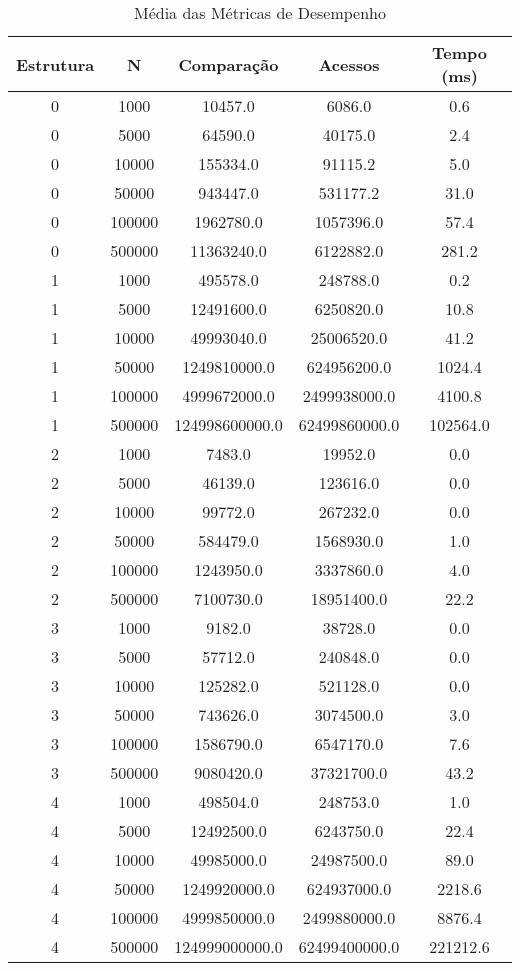 \begin{table}[htbp]
\caption{Média das Métricas de Desempenho}
\label{tab:table1}
\begin{tabular}{c|c|c|c|c}
\textbf{Estrutura} & \textbf{N} & \textbf{Comparação} & \textbf{Acessos} & \textbf{Tempo (ms)}\\
\hline
0 & 1000 & 10457.0 & 6086.0 & 0.6\\
0 & 5000 & 64590.0 & 40175.0 & 2.4\\
0 & 10000 & 155334.0 & 91115.2 & 5.0\\
0 & 50000 & 943447.0 & 531177.2 & 31.0\\
0 & 100000 & 1962780.0 & 1057396.0 & 57.4\\
0 & 500000 & 11363240.0 & 6122882.0 & 281.2\\
1 & 1000 & 495578.0 & 248788.0 & 0.2\\
1 & 5000 & 12491600.0 & 6250820.0 & 10.8\\
1 & 10000 & 49993040.0 & 25006520.0 & 41.2\\
1 & 50000 & 1249810000.0 & 624956200.0 & 1024.4\\
1 & 100000 & 4999672000.0 & 2499938000.0 & 4100.8\\
1 & 500000 & 124998600000.0 & 62499860000.0 & 102564.0\\
2 & 1000 & 7483.0 & 19952.0 & 0.0\\
2 & 5000 & 46139.0 & 123616.0 & 0.0\\
2 & 10000 & 99772.0 & 267232.0 & 0.0\\
2 & 50000 & 584479.0 & 1568930.0 & 1.0\\
2 & 100000 & 1243950.0 & 3337860.0 & 4.0\\
2 & 500000 & 7100730.0 & 18951400.0 & 22.2\\
3 & 1000 & 9182.0 & 38728.0 & 0.0\\
3 & 5000 & 57712.0 & 240848.0 & 0.0\\
3 & 10000 & 125282.0 & 521128.0 & 0.0\\
3 & 50000 & 743626.0 & 3074500.0 & 3.0\\
3 & 100000 & 1586790.0 & 6547170.0 & 7.6\\
3 & 500000 & 9080420.0 & 37321700.0 & 43.2\\
4 & 1000 & 498504.0 & 248753.0 & 1.0\\
4 & 5000 & 12492500.0 & 6243750.0 & 22.4\\
4 & 10000 & 49985000.0 & 24987500.0 & 89.0\\
4 & 50000 & 1249920000.0 & 624937000.0 & 2218.6\\
4 & 100000 & 4999850000.0 & 2499880000.0 & 8876.4\\
4 & 500000 & 124999000000.0 & 62499400000.0 & 221212.6\\
\end{tabular}
\end{table}
